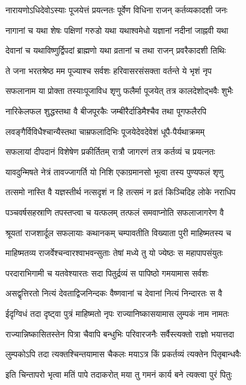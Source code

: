 \twolineshloka
{नारायणोऽधिदेवोऽस्याः पूजयेत्तं प्रयत्नतः}
{पूर्वेण विधिना राजन् कर्तव्यकादशी जनः} %

\twolineshloka
{नागानां च यथा शेषः पक्षिणां गरुडो यथा}
{यथाश्वमेधो यज्ञानां नदीनां जाह्नवी यथा} %

\twolineshloka
{देवानां च यथाविष्णुर्द्विपदां ब्राह्मणो यथा}
{व्रतानां च तथा राजन् प्रवरैकादशी तिथिः} %

\twolineshloka
{ते जना भरतश्रेष्ठ मम पूज्याश्च सर्वशः}
{हरिवासरसंसक्ता वर्तन्ते ये भृशं नृप} %

\twolineshloka
{सफलानाम या प्रोक्ता तस्याःपूजाविध शृणु}
{फलैर्मा पूजयेत् तत्र कालदेशोद्भवैः शुभैः} %

\twolineshloka
{नारिकेलफल शुद्धस्तथा वै बीजपूरकैः}
{जम्बीरैर्दाडिमैश्चैव तथा पूगफलैरपि} %

\twolineshloka
{लवङ्गैर्विविधैश्चान्यैस्तथा चाम्रफलादिभिः}
{पूजयेदेवदेवेशं धूपै-पैर्यथाक्रमम्} %

\twolineshloka
{सफलायां दीपदानं विशेषेण प्रकीर्तितम्}
{रात्रौ जागरणं तत्र कर्तव्यं च प्रयत्नतः} %

\twolineshloka
{यावदुन्मिषते नेत्रं तावज्जागर्ति यो निशि}
{एकाग्रमानसो भूत्वा तस्य पुण्यफलं शृणु} %

\twolineshloka
{तत्समो नास्ति वै यज्ञस्तीर्थ नत्सदृशं न हि}
{तत्समं न व्रतं किञ्चिदिह लोके नराधिप} %

\twolineshloka
{पञ्चवर्षसहस्राणि तपस्तप्त्वा च यत्फलम्}
{तत्फलं समवाप्नोति सफलाजागरेण वै} %

\twolineshloka
{श्रूयतां राजशार्दूल सफलायाः कथानकम्}
{चम्पावतीति विख्याता पुरी माहिष्मतस्य च} %

\twolineshloka
{माहिष्मतव्य राजर्वेश्चन्वारश्वाभवन्सुताः}
{तेषां मध्ये तु यो ज्येष्ठः स महापापसंयुतः} %

\twolineshloka
{परदाराभिगामी च यतवेश्यारतः सदा}
{पितुर्द्रव्यं स पापिष्ठो गमयामास सर्वशः} %

\twolineshloka
{असद्वृत्तिरतो नित्यं देवताद्विजनिन्दकः}
{वैष्णवानां च देवानां नित्यं निन्दारतः स वै} %

\twolineshloka
{ईदृग्विधं तदा दृष्ट्वा पुत्रं माहिष्मतो नृपः}
{राज्यानिष्कासयामास लुम्पकं नाम नामतः} %

\twolineshloka
{राज्यान्निष्कासितस्तेन पित्रा चैवापि बन्धुभिः}
{परिवारजनैः सर्वैस्त्यक्तो राज्ञो भयात्तदा} %

\twolineshloka
{लुम्पकोऽपि तदा त्यक्तश्चिन्तयामास चैकलः}
{मयाऽत्र किं प्रकर्तव्यं त्यक्तेन पितृबान्धवैः} %

\twolineshloka
{इति चिन्तापरो भृत्वा मतिं पापे तदाकरोत्}
{मया तु गमनं कार्य बने त्यक्त्वा पुरं पितुः} %

